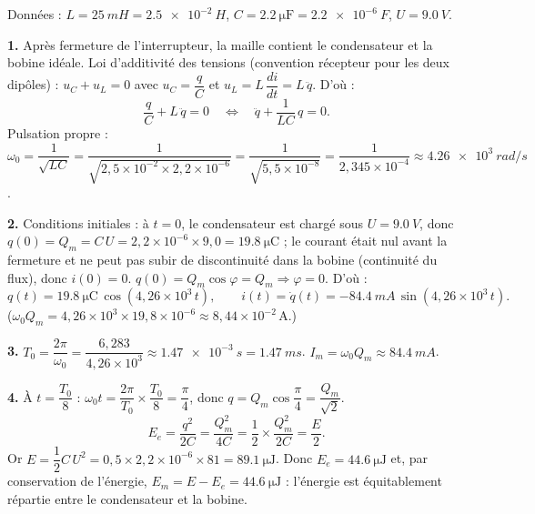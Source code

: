 \documentclass[11pt]{article}
\begin{document}
\begin{corrige}
Données : $L = \SI{25}{mH} = \SI{2,5e-2}{H}$, $C = \SI{2,2}{\micro\farad} = \SI{2,2e-6}{F}$, $U = \SI{9,0}{V}$.

\textbf{1.} Après fermeture de l'interrupteur, la maille contient le condensateur et la bobine idéale. Loi d'additivité des tensions (convention récepteur pour les deux dipôles) : $u_C + u_L = 0$ avec $u_C = \dfrac{q}{C}$ et $u_L = L\,\dfrac{di}{dt} = L\,\ddot{q}$. D'où :
\[
\frac{q}{C} + L\,\ddot{q} = 0 \quad\Longleftrightarrow\quad \ddot{q} + \frac{1}{LC}\,q = 0 .
\]
Pulsation propre : $\omega_0 = \dfrac{1}{\sqrt{LC}} = \dfrac{1}{\sqrt{2,5\times10^{-2} \times 2,2\times10^{-6}}} = \dfrac{1}{\sqrt{5,5\times10^{-8}}} = \dfrac{1}{2,345\times10^{-4}} \approx \SI{4,26e3}{rad/s}$.

\textbf{2.} Conditions initiales : à $t = 0$, le condensateur est chargé sous $U = \SI{9,0}{V}$, donc $q(0) = Q_m = C\,U = 2,2\times10^{-6} \times 9,0 = \SI{19,8}{\micro\coulomb}$ ; le courant était nul avant la fermeture et ne peut pas subir de discontinuité dans la bobine (continuité du flux), donc $i(0) = 0$.
$q(0) = Q_m\cos\varphi = Q_m \Rightarrow \varphi = 0$. D'où :
\[
q(t) = \SI{19,8}{\micro\coulomb}\,\cos(4,26\times10^{3}\,t), \qquad
i(t) = \dot{q}(t) = -\SI{84,4}{mA}\,\sin(4,26\times10^{3}\,t).
\]
($\omega_0 Q_m = 4,26\times10^{3} \times 19,8\times10^{-6} \approx 8,44\times10^{-2}\,\text{A}$.)

\textbf{3.} $T_0 = \dfrac{2\pi}{\omega_0} = \dfrac{6,283}{4,26\times10^{3}} \approx \SI{1,47e-3}{s} = \SI{1,47}{ms}$. \quad $I_m = \omega_0 Q_m \approx \SI{84,4}{mA}$.

\textbf{4.} À $t = \dfrac{T_0}{8}$ : $\omega_0 t = \dfrac{2\pi}{T_0}\times\dfrac{T_0}{8} = \dfrac{\pi}{4}$, donc $q = Q_m\cos\dfrac{\pi}{4} = \dfrac{Q_m}{\sqrt{2}}$.
\[
E_e = \frac{q^2}{2C} = \frac{Q_m^2}{4C} = \frac{1}{2}\times\frac{Q_m^2}{2C} = \frac{E}{2}.
\]
Or $E = \dfrac{1}{2}C\,U^2 = 0,5 \times 2,2\times10^{-6} \times 81 = \SI{89,1}{\micro\joule}$.
Donc $E_e = \SI{44,6}{\micro\joule}$ et, par conservation de l'énergie, $E_m = E - E_e = \SI{44,6}{\micro\joule}$ : l'énergie est équitablement répartie entre le condensateur et la bobine.
\end{corrige}
\end{document}
